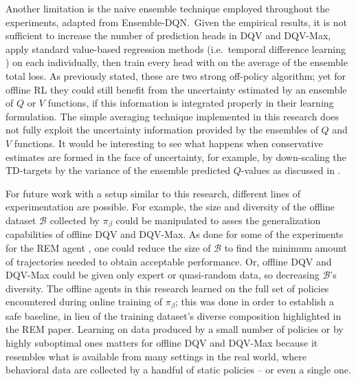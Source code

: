Another limitation is the naive ensemble technique employed throughout
the experiments, adapted from Ensemble-DQN.\ Given the empirical
results, it is not sufficient to increase the number of prediction
heads in DQV and DQV-Max, apply standard value-based regression
methods (i.e.\ temporal difference learning
\citep{sutton2018reinforcement}) on each individually, then train
every head with on the average of the ensemble total loss. As
previously stated, these are two strong off-policy algorithm; yet for
offline RL they could still benefit from the uncertainty estimated by
an ensemble of $Q$ or $V$ functions, if this information is integrated
properly in their learning formulation. The simple averaging technique
implemented in this research does not fully exploit the uncertainty
information provided by the ensembles of $Q$ and $V$ functions. It
would be interesting to see what happens when conservative estimates
are formed in the face of uncertainty, for example, by down-scaling
the TD-targets by the variance of the ensemble predicted $Q$-values as
discussed in \citet{levine2020offline}.

For future work with a setup similar to this research, different lines
of experimentation are possible. For example, the size and diversity
of the offline dataset $\mathcal{B}$ collected by $\pi_{\beta}$ could
be manipulated to asses the generalization capabilities of offline DQV
and DQV-Max. As done for some of the experiments for the REM agent
\citep{agarwal2020optimistic}, one could reduce the size of
$\mathcal{B}$ to find the minimum amount of trajectories needed to
obtain acceptable performance. Or, offline DQV and DQV-Max could be
given only expert or quasi-random data, so decreasing $\mathcal{B}$'s
diversity. The offline agents in this research learned on the full set
of policies encountered during online training of $\pi_{\beta}$; this
was done in order to establish a safe baseline, in lieu of the
training dataset's diverse composition highlighted in the REM
paper. Learning on data produced by a small number of policies or by
highly suboptimal ones matters for offline DQV and DQV-Max because it
resembles what is available from many settings in the real world,
where behavioral data are collected by a handful of static policies --
or even a single one.

